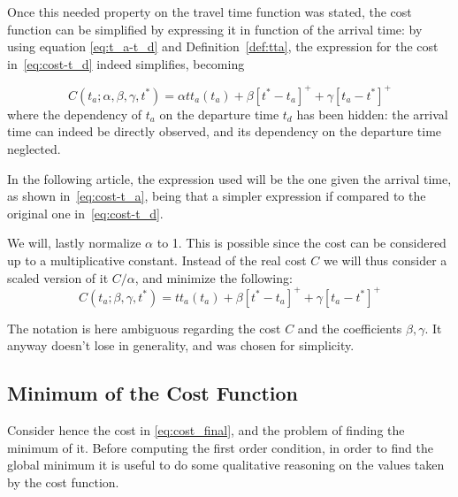 Once this needed property on the travel time function was stated,
the cost function can be simplified by expressing it in function of the arrival time:
by using equation \eqref{eq:t_a-t_d} and Definition~\ref{def:tta},
the expression for the cost in~\eqref{eq:cost-t_d} indeed simplifies,
becoming

\begin{equation}
  \label{eq:cost-t_a}
  C(t_a; \alpha, \beta, \gamma, t^*) = \alpha tt_a(t_a) + \beta[t^*- t_a]^+ + \gamma[t_a - t^*]^+ 
\end{equation}
where the dependency of \(t_a\) on the departure time \(t_d\) has been hidden:
the arrival time can indeed be directly observed,
and its dependency on the departure time neglected.

In the following article,
the expression used will be the one given the arrival time, as shown in~\eqref{eq:cost-t_a},
being that a simpler expression if compared to the original one in~\eqref{eq:cost-t_d}.

We will, lastly normalize \(\alpha\) to 1.
This is possible since the cost can be considered up to a multiplicative constant.
Instead of the real cost \(C\) we will thus consider a scaled version of it \(C/\alpha\),
and minimize the following:
\begin{equation}
  \label{eq:cost_final}
  C(t_a; \beta, \gamma, t^*) = tt_a(t_a) + \beta[t^*- t_a]^+ + \gamma[t_a - t^*]^+ 
\end{equation}

The notation is here ambiguous regarding the cost \(C\) and the coefficients \(\beta,\gamma\).
It anyway doesn't lose in generality, and was chosen for simplicity.

\subsection{Minimum of the Cost Function}
\label{sec:cost_minima}

Consider hence the cost in \eqref{eq:cost_final},
and the problem of finding the minimum of it.
Before computing the first order condition,
in order to find the global minimum it is useful to do some qualitative reasoning on the values taken by the cost function.

